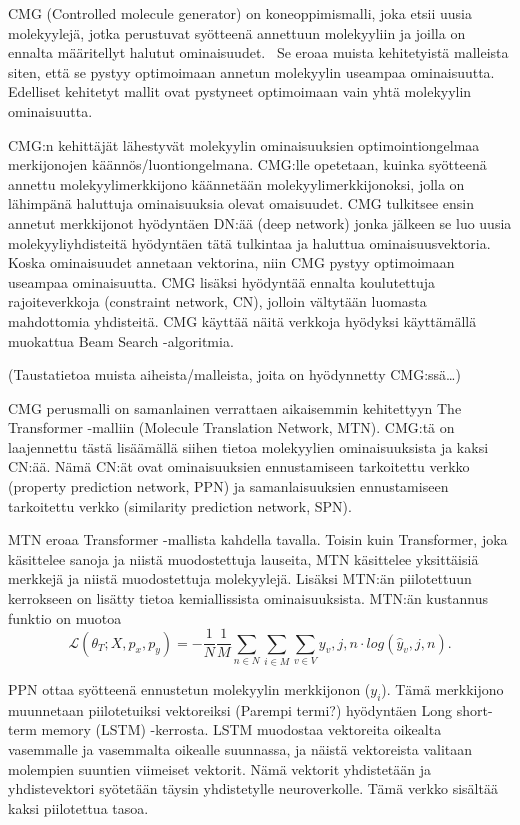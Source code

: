 \documentclass[finnish,twoside,censored,tkt,sw-line]{HYthesisML}
\begin{document}
CMG (Controlled molecule generator) on koneoppimismalli, joka etsii uusia molekyylejä, jotka perustuvat syötteenä annettuun molekyyliin ja joilla on ennalta määritellyt halutut ominaisuudet.~\cite{ShinBonggun}
Se eroaa muista kehitetyistä malleista siten, että se pystyy optimoimaan annetun molekyylin useampaa ominaisuutta.
Edelliset kehitetyt mallit ovat pystyneet optimoimaan vain yhtä molekyylin ominaisuutta.

CMG:n kehittäjät lähestyvät molekyylin ominaisuuksien optimointiongelmaa merkijonojen käännös/luontiongelmana.
CMG:lle opetetaan, kuinka syötteenä annettu molekyylimerkkijono käännetään molekyylimerkkijonoksi, jolla on lähimpänä haluttuja ominaisuuksia olevat omaisuudet.
CMG tulkitsee ensin annetut merkkijonot hyödyntäen DN:ää (deep network) jonka jälkeen se luo uusia molekyyliyhdisteitä hyödyntäen tätä tulkintaa ja haluttua ominaisuusvektoria.
Koska ominaisuudet annetaan vektorina, niin CMG pystyy optimoimaan useampaa ominaisuutta.
CMG lisäksi hyödyntää ennalta koulutettuja rajoiteverkkoja (constraint network, CN), jolloin vältytään luomasta mahdottomia yhdisteitä.
CMG käyttää näitä verkkoja hyödyksi käyttämällä muokattua Beam Search -algoritmia.

(Taustatietoa muista aiheista/malleista, joita on hyödynnetty CMG:ssä\dots)

CMG perusmalli on samanlainen verrattaen aikaisemmin kehitettyyn The Transformer -malliin (Molecule Translation Network, MTN).\cite{TheTransformer}
CMG:tä on laajennettu tästä lisäämällä siihen tietoa molekyylien ominaisuuksista ja kaksi CN:ää.
Nämä CN:ät ovat ominaisuuksien ennustamiseen tarkoitettu verkko (property prediction network, PPN) ja samanlaisuuksien ennustamiseen tarkoitettu verkko (similarity prediction network, SPN).

MTN eroaa Transformer -mallista kahdella tavalla.
Toisin kuin Transformer, joka käsittelee sanoja ja niistä muodostettuja lauseita, MTN käsittelee yksittäisiä merkkejä ja niistä muodostettuja molekyylejä.
Lisäksi MTN:än piilotettuun kerrokseen on lisätty tietoa kemiallissista ominaisuuksista.
MTN:än kustannus funktio on muotoa \[\mathcal{L} (\theta_T;X,p_x,p_y) = -\frac{1}{N}\frac{1}{M}\sum_{n \in N}\sum_{i \in M}\sum_{v \in V}y_v,j,n \cdot log(\hat{y}_v,j,n).\]

PPN ottaa syötteenä ennustetun molekyylin merkkijonon ($y_i$).
Tämä merkkijono muunnetaan piilotetuiksi vektoreiksi (Parempi termi?) hyödyntäen Long short-term memory (LSTM) -kerrosta.
LSTM muodostaa vektoreita oikealta vasemmalle ja vasemmalta oikealle suunnassa, ja näistä vektoreista valitaan molempien suuntien viimeiset vektorit.
Nämä vektorit yhdistetään ja yhdistevektori syötetään täysin yhdistetylle neuroverkolle.
Tämä verkko sisältää kaksi piilotettua tasoa.
\end{document}
